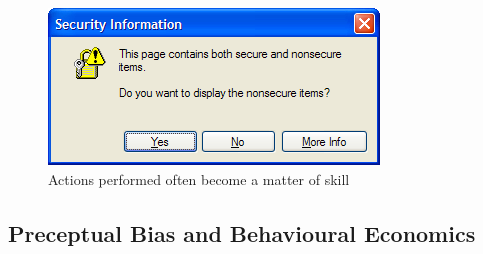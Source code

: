 	\begin{figure}[H]
		\centering
		\includegraphics[scale=0.8]{pics/insecureweb.png}
		\caption{Actions performed often become a matter of skill}
	\end{figure}

	\clearpage
	\subsection*{Preceptual Bias and Behavioural Economics}
